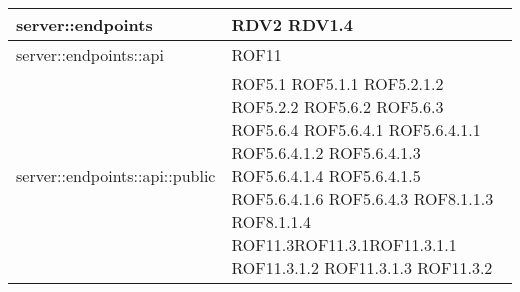 \begin{center}
\begin{longtable}{| p{9cm} | p{4cm} |}
\hline
server::endpoints  &  RDV2 \newline RDV1.4 \newline \\
\hline
server::endpoints::api  &  ROF11 \newline \\
\hline
server::endpoints::api::public  &  ROF5.1 \newline ROF5.1.1 \newline ROF5.2.1.2 \newline ROF5.2.2 \newline ROF5.6.2 \newline ROF5.6.3 \newline ROF5.6.4 \newline ROF5.6.4.1 \newline ROF5.6.4.1.1 \newline ROF5.6.4.1.2 \newline ROF5.6.4.1.3 \newline ROF5.6.4.1.4 \newline ROF5.6.4.1.5 \newline ROF5.6.4.1.6 \newline ROF5.6.4.3 \newline ROF8.1.1.3 \newline  ROF8.1.1.4 \newline ROF11.3\newline ROF11.3.1\newline ROF11.3.1.1 \newline ROF11.3.1.2 \newline ROF11.3.1.3  \newline ROF11.3.2\newline\\
\hline

\end{longtable}
\end{center}
